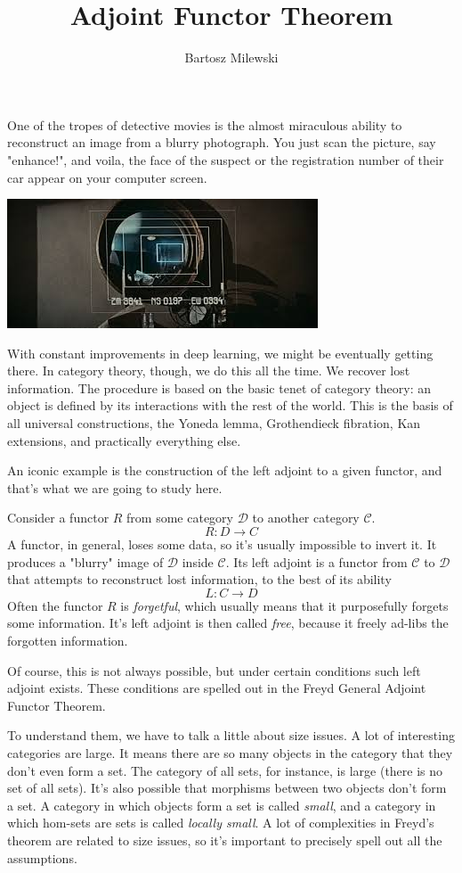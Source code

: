 \documentclass[11pt]{amsart}
\author{Bartosz Milewski}
\title{Adjoint Functor Theorem}
\newcommand{\cat}[1]{\mathcal{#1}}
\begin{document}
\maketitle{}

One of the tropes of detective movies is the almost miraculous ability to reconstruct an image from a blurry photograph. You just scan the picture,  say "enhance!", and voila, the face of the suspect or the registration number of their car appear on your computer screen. 

\includegraphics{BladeRunner.jpeg}

With constant improvements in deep learning, we might be eventually getting there. In category theory, though, we do this all the time. We recover lost information. The procedure is based on the basic tenet of category theory: an object is defined by its interactions with the rest of the world. This is the basis of all universal constructions, the Yoneda lemma, Grothendieck fibration, Kan extensions, and practically everything else. 

An iconic example is the construction of the left adjoint to a given functor, and that's what we are going to study here. 

Consider a functor $R$ from some category $\cat D$ to another category $\cat C$. 
\[R \colon D \to C \]
A functor, in general, loses some data, so it's usually impossible to invert it. It produces a "blurry" image of $\cat D$ inside $\cat C$. Its left adjoint is a functor from $\cat C$ to $\cat D$ that attempts to reconstruct lost information, to the best of its ability 
\[ L \colon C \to D\]
Often the functor $R$ is \emph{forgetful}, which usually means that it purposefully forgets some information. It's left adjoint is then called \emph{free}, because it freely ad-libs the forgotten information. 


Of course, this is not always possible, but under certain conditions such left adjoint exists. These conditions are spelled out in the Freyd General Adjoint Functor Theorem. 

To understand them, we have to talk a little about size issues. A lot of interesting categories are large. It means there are so many objects in the category that they don't even form a set. The category of all sets, for instance, is large (there is no set of all sets). It's also possible that morphisms between two objects don't form a set. A category in which objects form a set is called \emph{small}, and a category in which hom-sets are sets is called \emph{locally small}. A lot of complexities in Freyd's theorem are related to size issues, so it's important to precisely spell out all the assumptions.
\end{document}
